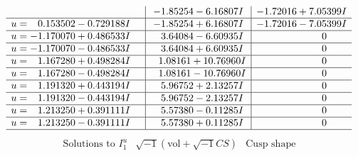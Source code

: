\documentclass[1p]{elsarticle_modified}
\theoremstyle{definition}
\newcommand{\I}{\sqrt{-1}}
\begin{document}
$$\begin{array}{c|c|c}
 & -1.85254 - 6.16807 I & -1.72016 + 7.05399 I \\ \hline\begin{aligned}
u &= \phantom{-}0.153502 - 0.729188 I\end{aligned}
 & -1.85254 + 6.16807 I & -1.72016 - 7.05399 I \\ \hline\begin{aligned}
u &= -1.170070 + 0.486533 I\end{aligned}
 & \phantom{-}3.64084 - 6.60935 I & \phantom{-0.000000 } 0 \\ \hline\begin{aligned}
u &= -1.170070 - 0.486533 I\end{aligned}
 & \phantom{-}3.64084 + 6.60935 I & \phantom{-0.000000 } 0 \\ \hline\begin{aligned}
u &= \phantom{-}1.167280 + 0.498284 I\end{aligned}
 & \phantom{-}1.08161 + 10.76960 I & \phantom{-0.000000 } 0 \\ \hline\begin{aligned}
u &= \phantom{-}1.167280 - 0.498284 I\end{aligned}
 & \phantom{-}1.08161 - 10.76960 I & \phantom{-0.000000 } 0 \\ \hline\begin{aligned}
u &= \phantom{-}1.191320 + 0.443194 I\end{aligned}
 & \phantom{-}5.96752 + 2.13257 I & \phantom{-0.000000 } 0 \\ \hline\begin{aligned}
u &= \phantom{-}1.191320 - 0.443194 I\end{aligned}
 & \phantom{-}5.96752 - 2.13257 I & \phantom{-0.000000 } 0 \\ \hline\begin{aligned}
u &= \phantom{-}1.213250 + 0.391111 I\end{aligned}
 & \phantom{-}5.57380 - 0.11285 I & \phantom{-0.000000 } 0 \\ \hline\begin{aligned}
u &= \phantom{-}1.213250 - 0.391111 I\end{aligned}
 & \phantom{-}5.57380 + 0.11285 I & \phantom{-0.000000 } 0\\
 \hline 
 \end{array}$$\newpage$$\begin{array}{c|c|c}  
\text{Solutions to }I^u_{1}& \I (\text{vol} + \sqrt{-1}CS) & \text{Cusp shape}\\

\end{array}$$
\end{document}

